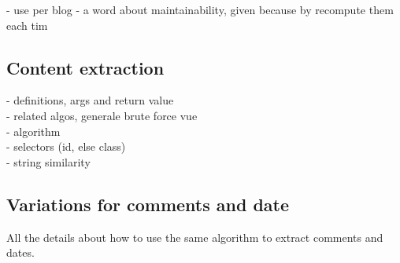 - use per blog
- a word about maintainability, given because by recompute them each tim


\subsection{Content extraction}
- definitions, args and return value \\
- related algos, generale brute force vue \\
- algorithm \\
- selectors (id, else class) \\
- string similarity \\

\subsection{Variations for comments and date}
All the details about how to use the same algorithm to extract comments and dates.
